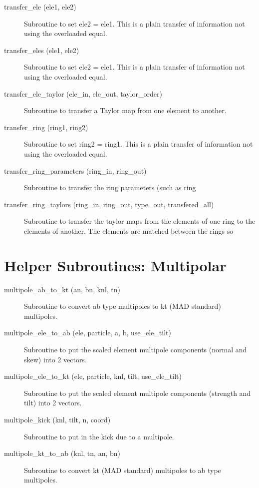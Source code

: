 \begin{description}
\item[transfer\_ele (ele1, ele2)] \Newline 
     Subroutine to set ele2 = ele1. 
     This is a plain transfer of information not using the overloaded equal.

\item[transfer\_eles (ele1, ele2)] \Newline 
     Subroutine to set ele2 = ele1. 
     This is a plain transfer of information not using the overloaded equal.

\item[transfer\_ele\_taylor (ele\_in, ele\_out, taylor\_order)] \Newline 
     Subroutine to transfer a Taylor map from one element to another.

\item[transfer\_ring (ring1, ring2)] \Newline 
     Subroutine to set ring2 = ring1. 
     This is a plain transfer of information not using the overloaded equal.

\item[transfer\_ring\_parameters (ring\_in, ring\_out)] \Newline
Subroutine to transfer the ring parameters (such as ring%

\item[transfer\_ring\_taylors (ring\_in, ring\_out, 
                                             type\_out, transfered\_all) ] \Newline 
     Subroutine to transfer the taylor maps from the elements of one ring to
     the elements of another. The elements are matched between the rings so 

\end{description}

\section{Helper Subroutines: Multipolar}
\label{r:multi}    

\begin{description}

\item[multipole\_ab\_to\_kt (an, bn, knl, tn)] \Newline
Subroutine to convert ab type multipoles to kt (MAD standard) multipoles. 

\item[multipole\_ele\_to\_ab (ele, particle, a, b, use\_ele\_tilt)] \Newline
Subroutine to put the scaled element multipole components (normal and skew) into 2 vectors. 

\item[multipole\_ele\_to\_kt (ele, particle, knl, tilt, use\_ele\_tilt)] \Newline
Subroutine to put the scaled element multipole components (strength and tilt) into 2 vectors. 

\item[multipole\_kick (knl, tilt, n, coord)] \Newline
Subroutine to put in the kick due to a multipole. 

\item[multipole\_kt\_to\_ab (knl, tn, an, bn)] \Newline
Subroutine to convert kt (MAD standard) multipoles to ab type multipoles. 

\end{description}

